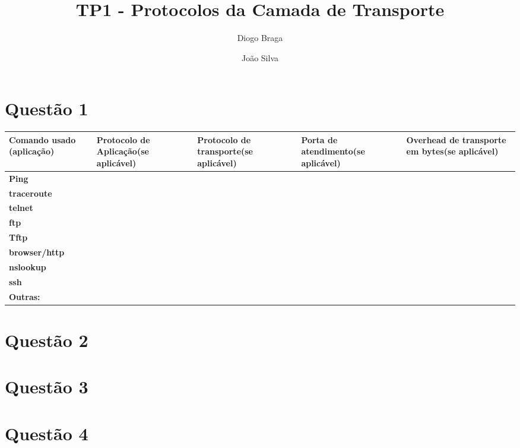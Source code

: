 \documentclass{llncs}
\begin{document}
\mainmatter
\title{TP1 - Protocolos da Camada de Transporte}


\author{Diogo Braga \and João Silva}



\date{}


\maketitle

\section{Questão 1}



\begin{center}
\begin{tabular}{ | m{3cm} | m{3cm} | m{3cm} | m{3cm} | m{3cm} |}
\hline
 \textbf{Comando usado (aplicação)} & \textbf{Protocolo de Aplicação(se aplicável)} & \textbf{Protocolo de transporte(se aplicável)} & \textbf{Porta de atendimento(se aplicável)} & \textbf{Overhead de transporte em bytes(se aplicável)} \\
 \hline
 \textbf{Ping} &  &  &  &  \\
 \hline
 \textbf{traceroute} &  &  &  &  \\
 \hline
 \textbf{telnet} &  &  &  &  \\
 \hline
 \textbf{ftp} &  &  &  &  \\
 \hline
 \textbf{Tftp} &  &  &  &  \\
 \hline
 \textbf{browser/http} &  &  &  &  \\
 \hline
 \textbf{nslookup} &  &  &  &  \\
 \hline
 \textbf{ssh} &  &  &  &  \\
 \hline
 \textbf{Outras:} &  &  &  &  \\
 \hline
\end{tabular}
\end{center}



\section{Questão 2}

\section{Questão 3}

\section{Questão 4}
\end{document}
